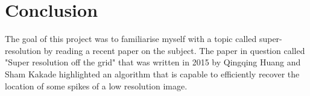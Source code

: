 \chapter{Conclusion}
The goal of this project was to familiarise myself with a topic called super-resolution by reading a recent paper on the subject. The paper in question called "Super resolution off the grid" that was written in 2015 by Qingqing Huang and Sham Kakade highlighted an algorithm that is capable to efficiently recover the location of some spikes of a low resolution image.\par